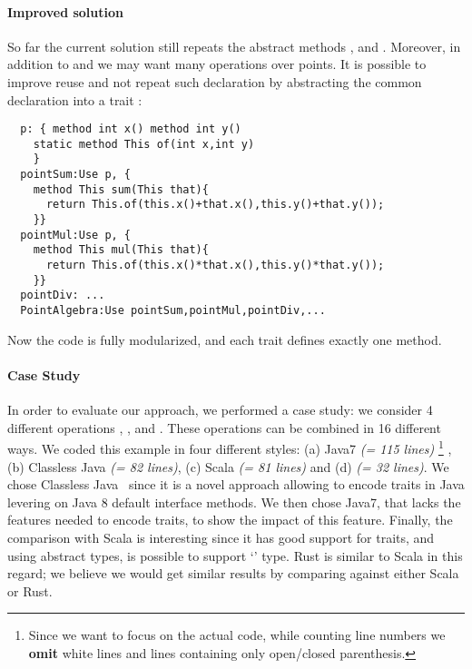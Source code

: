  \paragraph{Improved solution} So far the current solution still
  repeats the abstract methods \Q@x@, \Q@y@ and \Q@of@.
  Moreover, in addition to \Q@sum@ and \Q@mul@ we may want many
  operations over points. It is possible to improve reuse
  and not repeat such declaration by abstracting the common
  declaration into a trait \Q@p@: 
\saveSpace
\begin{lstlisting}
  p: { method int x() method int y()
    static method This of(int x,int y)
    }
  pointSum:Use p, { 
    method This sum(This that){
      return This.of(this.x()+that.x(),this.y()+that.y());
    }}
  pointMul:Use p, { 
    method This mul(This that){
      return This.of(this.x()*that.x(),this.y()*that.y());
    }}
  pointDiv: ...
  PointAlgebra:Use pointSum,pointMul,pointDiv,...
\end{lstlisting}
\saveSpace      
Now the code is fully modularized, and each trait defines exactly one method.

\paragraph{Case Study}
In order to evaluate our approach,
we performed a case study:
we consider 4 different operations \Q@Sum@, \Q@Subtraction@, \Q@Multiplication@ and \Q@Division@.
These operations can be combined in 16 different ways.
We coded this example in four different styles:
(a) Java7 \emph{(= 115 lines)}%
\footnote{
Since we want to focus on the actual code, while counting line numbers we \textbf{omit} white lines and lines containing only open/closed parenthesis.
}%
, (b) Classless Java \emph{(= 82 lines)},
(c) Scala \emph{(= 81 lines)} and (d) \name \emph{(= 32 lines)}.
We chose Classless Java~\cite{wang2016classless} since it is a novel approach allowing to encode traits in Java levering on 
Java 8 default interface methods.
We then chose Java7, that lacks the features needed to encode traits, to show the impact of this feature.
Finally, the comparison with Scala is interesting 
since
it has good support for traits, and using abstract types, is possible to support `\Q@This@' type.
Rust is similar to Scala in this regard; we believe we would get similar results by comparing against either Scala or Rust.

